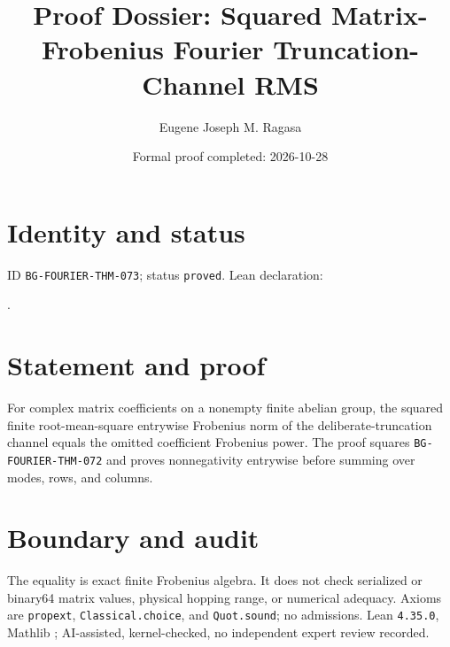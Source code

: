 \documentclass[11pt]{article}
\title{Proof Dossier: Squared Matrix-Frobenius Fourier Truncation-Channel RMS}\author{Eugene Joseph M. Ragasa}\date{Formal proof completed: 2026-10-28}
\begin{document}
\raggedright\maketitle
\section{Identity and status}
ID \texttt{BG-FOURIER-THM-073}; status \texttt{proved}. Lean declaration:
\par{}.
\section{Statement and proof}
For complex matrix coefficients on a nonempty finite abelian group, the squared finite root-mean-square entrywise Frobenius norm of the deliberate-truncation channel equals the omitted coefficient Frobenius power. The proof squares \texttt{BG-FOURIER-THM-072} and proves nonnegativity entrywise before summing over modes, rows, and columns.
\section{Boundary and audit}
The equality is exact finite Frobenius algebra. It does not check serialized or binary64 matrix values, physical hopping range, or numerical adequacy. Axioms are \texttt{propext}, \texttt{Classical.choice}, and \texttt{Quot.sound}; no admissions. Lean \texttt{4.35.0}, Mathlib {\scriptsize{}}; AI-assisted, kernel-checked, no independent expert review recorded.
\end{document}
